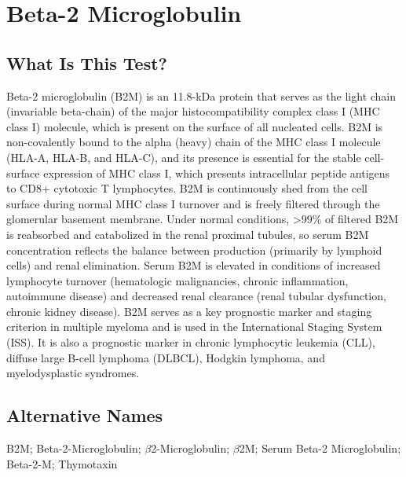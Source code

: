\chapter{Beta-2 Microglobulin}

\section*{What Is This Test?}
Beta-2 microglobulin (B2M) is an 11.8-kDa protein that serves as the light chain (invariable beta-chain) of the major histocompatibility complex class I (MHC class I) molecule, which is present on the surface of all nucleated cells. B2M is non-covalently bound to the alpha (heavy) chain of the MHC class I molecule (HLA-A, HLA-B, and HLA-C), and its presence is essential for the stable cell-surface expression of MHC class I, which presents intracellular peptide antigens to CD8+ cytotoxic T lymphocytes. B2M is continuously shed from the cell surface during normal MHC class I turnover and is freely filtered through the glomerular basement membrane. Under normal conditions, >99\% of filtered B2M is reabsorbed and catabolized in the renal proximal tubules, so serum B2M concentration reflects the balance between production (primarily by lymphoid cells) and renal elimination. Serum B2M is elevated in conditions of increased lymphocyte turnover (hematologic malignancies, chronic inflammation, autoimmune disease) and decreased renal clearance (renal tubular dysfunction, chronic kidney disease). B2M serves as a key prognostic marker and staging criterion in multiple myeloma and is used in the International Staging System (ISS). It is also a prognostic marker in chronic lymphocytic leukemia (CLL), diffuse large B-cell lymphoma (DLBCL), Hodgkin lymphoma, and myelodysplastic syndromes.

\section*{Alternative Names}
B2M; Beta-2-Microglobulin; $\beta$2-Microglobulin; $\beta$2M; Serum Beta-2 Microglobulin; Beta-2-M; Thymotaxin

